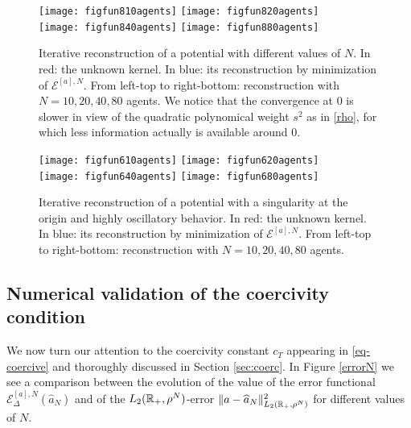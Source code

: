 \begin{figure}[h!]
\begin{center}
\hspace{-0.7cm}\texttt{[image: figfun810agents]}\hspace{-0.9cm}
\texttt{[image: figfun820agents]}\\
\hspace{-0.7cm}\texttt{[image: figfun840agents]}\hspace{-0.9cm}
\texttt{[image: figfun880agents]}
\end{center}
\caption{Iterative reconstruction of a potential with different values of $N$. In red: the unknown kernel. In blue: its reconstruction by minimization of $\mathcal{E}^{[a],N}$. From left-top to right-bottom: reconstruction with $N = 10, 20, 40, 80$ agents. We notice that the convergence at $0$ is slower in view of the quadratic polynomical weight $s^2$ as in \eqref{rho}, for which less information actually is available around $0$.}\label{variableN}
\end{figure}

\begin{figure}[h!]
\begin{center}
\hspace{-0.7cm}\texttt{[image: figfun610agents]}\hspace{-0.9cm}
\texttt{[image: figfun620agents]}\\
\hspace{-0.7cm}\texttt{[image: figfun640agents]}\hspace{-0.9cm}
\texttt{[image: figfun680agents]}
\end{center}
\caption{Iterative reconstruction of a potential with a singularity at the origin and highly oscillatory behavior. In red: the unknown kernel. In blue: its reconstruction by minimization of $\mathcal{E}^{[a],N}$. From left-top to right-bottom: reconstruction with $N = 10, 20, 40, 80$ agents.}\label{variableN2}
\end{figure}

\subsection{Numerical validation of the coercivity condition}\label{numcoer}

We now turn our attention to the coercivity constant $c_T$ appearing in \eqref{eq-coercive} and thoroughly discussed in Section \ref{sec:coerc}. In Figure \ref{errorN} we see a comparison between the evolution of the value of the error functional $\mathcal{E}^{[a],N}_\Delta(\widehat{a}_N)$ and of the $L_2(\mathbb{R}_+,\rho^N)$-error $\|a-\widehat{a}_N\|^2_{L_2(\mathbb{R}_+,\rho^N)}$ for different values of $N$. 

